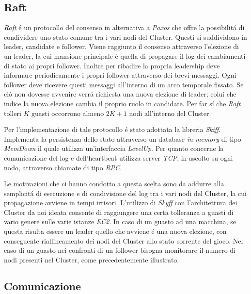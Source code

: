 \documentclass{sig-alternate-05-2015}
\begin{document}
\subsection{Raft}


\textit{Raft} \'e un protocollo del consenso in alternativa a \textit{Paxos} che offre la possibilit\'a di condividere uno stato comune tra i vari nodi del Cluster. Questi si suddividono in leader, candidate e follower. Viene raggiunto il consenso attraverso l'elezione di un leader, la cui mansione principale \'e quella di propagare il log dei cambiamenti di stato ai propri follower. Inoltre per ribadire la propria leadership deve informare periodicamente i propri follower attraverso dei brevi messaggi.
Ogni follower deve ricevere questi messaggi all'interno di un arco temporale fissato. Se ci\'o non dovesse avvenire verr\'a richiesta una nuova elezione di leader; colui che indice la nuova elezione cambia il proprio ruolo in candidate. Per far s\'i che \textit{Raft} tolleri \begin{math} K \end{math} guasti occorrono almeno \begin{math} 2K+1 \end{math} nodi all'interno del Cluster.

Per l'implementazione di tale protocollo \'e stato adottata la libreria \textit{Skiff}. %
 Implementa la persistenza dello stato attraverso un database \textit{in-memory} di tipo \textit{MemDown} il quale utilizza un'interfaccia \textit{LevelUp}. Per quanto concerne la comunicazione del log e dell'heartbeat utilizza server \textit{TCP}, in ascolto su ogni nodo, attraverso chiamate di tipo \textit{RPC}.
 
Le motivazioni che ci hanno condotto a questa scelta sono da addurre alla semplicit\'a di esecuzione e di condivisione del log tra i vari nodi del Cluster, la cui propagazione avviene in tempi irrisori.
L'utilizzo di \textit{Skyff} con l'architettura dei Cluster da noi ideata consente di raggiungere una certa tolleranza a guasti di vario genere sulle varie istanze \textit{EC2}.
In caso di un guasto ad una macchina, se questa risulta essere un leader quello che avviene \'e una nuova elezione, con conseguente riallineamento dei nodi del Cluster allo stato corrente del gioco.
Nel caso di un guasto nei confronti di un follower bisogna monitorare il numero di nodi presenti nel Cluster, come precedentemente illustrato.

\subsection{Comunicazione}
\end{document}
